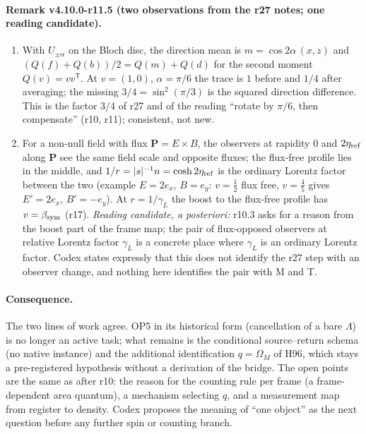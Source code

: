 \paragraph{Remark v4.10.0-r11.5 (two observations from the r27 notes; one reading candidate).}
\begin{enumerate}[leftmargin=2em]
\item[(a)] With \(U_{\pm\alpha}\) on the Bloch disc, the direction mean is \(m=\cos2\alpha\,(x,z)\) and \((Q(f)+Q(b))/2=Q(m)+Q(d)\) for the second moment
\(Q(v)=vv^{\mathsf T}\).  At \(v=(1,0)\), \(\alpha=\pi/6\) the trace is \(1\) before and \(1/4\) after averaging; the missing \(3/4=\sin^2(\pi/3)\) is the squared
direction difference.  This is the factor \(3/4\) of r27 and of the reading ``rotate by \(\pi/6\), then compensate'' (r10, r11); consistent, not new.
\item[(b)] For a non-null field with flux \(\mathbf P=E\times B\), the observers at rapidity \(0\) and \(2\eta_{\rm ref}\) along \(\mathbf P\) see the same field
scale and opposite fluxes; the flux-free profile lies in the middle, and \(1/r=|s|^{-1}n=\cosh2\eta_{\rm ref}\) is the ordinary Lorentz factor between the
two (example \(E=2e_x\), \(B=e_y\): \(v=\tfrac12\) flux free, \(v=\tfrac45\) gives \(E'=2e_x\), \(B'=-e_y\)).  At \(r=1/\gamma_L\) the boost to the flux-free
profile has \(v=\beta_{\rm sym}\) (r17).  \emph{Reading candidate, a posteriori:} r10.3 asks for a reason from the boost part of the frame map; the pair of
flux-opposed observers at relative Lorentz factor \(\gamma_L\) is a concrete place where \(\gamma_L\) is an ordinary Lorentz factor.  Codex states expressly
that this does not identify the r27 step with an observer change, and nothing here identifies the pair with M and T.
\end{enumerate}

\paragraph{Consequence.}
The two lines of work agree.  OP5 in its historical form (cancellation of a bare \(\Lambda\)) is no longer an active task; what remains is the conditional
source--return schema (no native instance) and the additional identification \(q=\Omega_M\) of H96, which stays a pre-registered hypothesis without a
derivation of the bridge.  The open points are the same as after r10: the reason for the counting rule per frame (a frame-dependent area quantum), a
mechanism selecting \(q\), and a measurement map from register to density.  Codex proposes the meaning of ``one object'' as the next question before
any further spin or counting branch.

